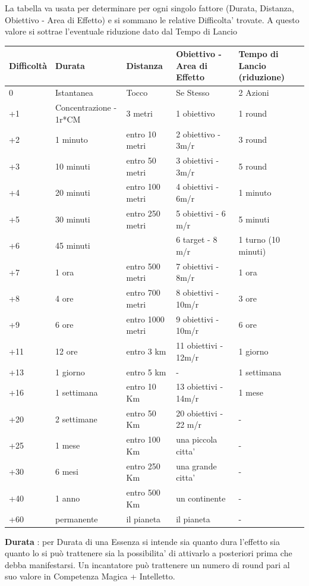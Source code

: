 \documentclass[a4paper,11pt,twoside,openany]{book}
\begin{document}
La tabella va usata per determinare per ogni singolo fattore (Durata, Distanza, Obiettivo - Area di Effetto) e si sommano le relative Difficolta' trovate.
A questo valore si sottrae l'eventuale riduzione dato dal Tempo di Lancio


\begin{tabularx}{0.95\textwidth}{XXXXX}
	\hline
\textbf{Difficoltà} &\textbf{Durata} &\textbf{Distanza} &\textbf{Obiettivo - Area di Effetto} &\textbf{Tempo di Lancio (riduzione)} \\
\hline
0	& Istantanea		& Tocco	& Se Stesso& 2 Azioni\\
\hline
+1	& Concentrazione - 1r*CM	& 3 metri& 1 obiettivo& 1 round\\
\hline
+2	& 1 minuto	& entro 10 metri&2 obiettivo - 3m/r& 3 round\\
\hline
+3	&	10 minuti& entro 50 metri& 3 obiettivi - 3m/r	& 5 round\\
\hline
+4	& 20 minuti	& entro 100 metri&4 obiettivi - 6m/r&1 minuto\\
\hline
+5&30 minuti&entro 250 metri&5 obiettivi - 6 m/r&5 minuti\\
\hline
+6&45 minuti&&6 target - 8 m/r&1 turno (10 minuti)\\
\hline
+7&1 ora&entro 500 metri&7 obiettivi - 8m/r&1 ora\\
\hline
+8&4 ore&entro 700 metri&8 obiettivi - 10m/r&3 ore\\
\hline
+9&6 ore&entro 1000 metri&9 obiettivi - 10m/r&6 ore\\
\hline	
+11&12 ore&entro 3 km&11 obiettivi - 12m/r&1 giorno\\
\hline	
+13&1 giorno&entro 5 km&-&1 settimana\\
\hline	
+16&1 settimana&entro 10 Km&13 obiettivi - 14m/r&1 mese\\
\hline	
+20&2 settimane&entro 50 Km&20 obiettivi - 22 m/r&-\\
\hline	
+25&1 mese&entro 100 Km&una piccola citta'&-\\
\hline	
+30&6 mesi&entro 250 Km&una grande citta'&-\\
\hline	
+40&1 anno&entro 500 Km&un continente&-\\
\hline	
+60&permanente&il pianeta&il pianeta&-\\
\hline	
\end{tabularx}

\bigskip

\textbf{Durata} : per Durata di una Essenza si intende sia quanto dura l'effetto sia quanto lo si può trattenere sia la possibilita' di attivarlo a posteriori prima che debba manifestarsi. Un incantatore può trattenere un numero di round pari al suo valore in Competenza Magica + Intelletto.
\end{document}
